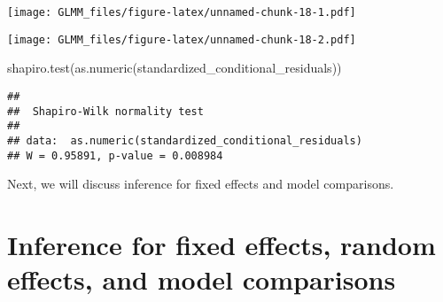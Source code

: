\documentclass[
]{book}
\newenvironment{Shaded}{\begin{snugshade}}{\end{snugshade}}
\newcommand{\FunctionTok}[1]{\textcolor[rgb]{0.00,0.00,0.00}{#1}}
\newcommand{\NormalTok}[1]{#1}
\newcommand{\OtherTok}[1]{\textcolor[rgb]{0.56,0.35,0.01}{#1}}
\newcommand{\SpecialCharTok}[1]{\textcolor[rgb]{0.00,0.00,0.00}{#1}}
\begin{document}
\texttt{[image: GLMM\_files/figure-latex/unnamed-chunk-18-1.pdf]}

\begin{Shaded}
\end{Shaded}

\texttt{[image: GLMM\_files/figure-latex/unnamed-chunk-18-2.pdf]}

\begin{Shaded}
\begin{Highlighting}[]
\FunctionTok{shapiro.test}\NormalTok{(}\FunctionTok{as.numeric}\NormalTok{(standardized\_conditional\_residuals))}
\end{Highlighting}
\end{Shaded}

\begin{verbatim}
## 
##  Shapiro-Wilk normality test
## 
## data:  as.numeric(standardized_conditional_residuals)
## W = 0.95891, p-value = 0.008984
\end{verbatim}

Next, we will discuss inference for fixed effects and model comparisons.

\hypertarget{inference-for-fixed-effects-random-effects-and-model-comparisons}{%
\section{Inference for fixed effects, random effects, and model comparisons}\label{inference-for-fixed-effects-random-effects-and-model-comparisons}}
\end{document}
